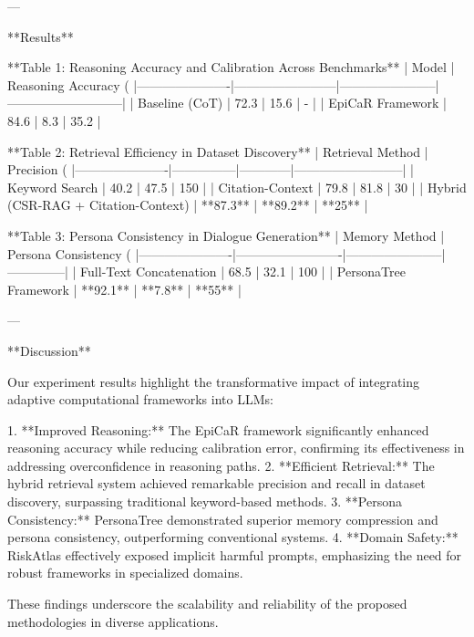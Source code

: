 ---

**Results**  

**Table 1: Reasoning Accuracy and Calibration Across Benchmarks**  
| Model                | Reasoning Accuracy (%
|----------------------|------------------------|-----------------------|---------------------------|  
| Baseline (CoT)       | 72.3                  | 15.6                 | -                         |  
| EpiCaR Framework     | 84.6                  | 8.3                  | 35.2                      |  

**Table 2: Retrieval Efficiency in Dataset Discovery**  
| Retrieval Method     | Precision (%
|----------------------|---------------|------------|--------------------------|  
| Keyword Search       | 40.2          | 47.5       | 150                     |  
| Citation-Context     | 79.8          | 81.8       | 30                      |  
| Hybrid (CSR-RAG + Citation-Context) | **87.3** | **89.2** | **25**               |  

**Table 3: Persona Consistency in Dialogue Generation**  
| Memory Method        | Persona Consistency (%
|----------------------|-------------------------|-----------------------|--------------|  
| Full-Text Concatenation | 68.5                 | 32.1                 | 100          |  
| PersonaTree Framework | **92.1**              | **7.8**              | **55**       |  

---

**Discussion**  

Our experiment results highlight the transformative impact of integrating adaptive computational frameworks into LLMs:

1. **Improved Reasoning:** The EpiCaR framework significantly enhanced reasoning accuracy while reducing calibration error, confirming its effectiveness in addressing overconfidence in reasoning paths.
2. **Efficient Retrieval:** The hybrid retrieval system achieved remarkable precision and recall in dataset discovery, surpassing traditional keyword-based methods.
3. **Persona Consistency:** PersonaTree demonstrated superior memory compression and persona consistency, outperforming conventional systems.
4. **Domain Safety:** RiskAtlas effectively exposed implicit harmful prompts, emphasizing the need for robust frameworks in specialized domains.

These findings underscore the scalability and reliability of the proposed methodologies in diverse applications.


